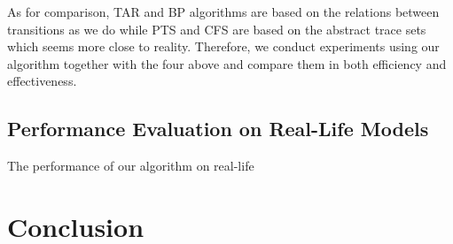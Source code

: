 \documentclass{llncs}
\begin{document}
As for comparison, TAR and BP algorithms are based on the relations between transitions as we do while PTS and CFS are based on the abstract trace sets which seems more close to reality. Therefore, we conduct experiments using our algorithm together with the four above and compare them in both efficiency and effectiveness.

\subsection{Performance Evaluation on Real-Life Models}\label{subsec:performance}
The performance of our algorithm on real-life

\section{Conclusion}\label{sec:conclusion}




\end{document}
